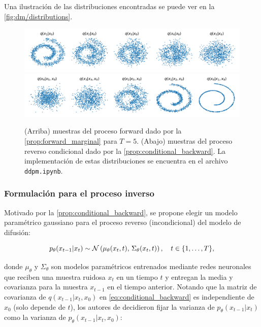 Una ilustración de las distribuciones encontradas se puede ver en la \autoref{fig:dm/distributions}.

\begin{figure}[!ht]
    \centering
    \includegraphics[width=\textwidth]{images/dm/ddpm_forward}
    \includegraphics[width=\textwidth]{images/dm/ddpm_conditional_backward}
    \caption{(Arriba) muestras del proceso forward dado por la \autoref{prop:forward_marginal} para $T=5$. (Abajo) muestras del proceso reverso condicional dado por la \autoref{prop:conditional_backward}. La implementación de estas distribuciones se encuentra en el archivo \texttt{ddpm.ipynb}.}
    \label{fig:dm/distributions}
\end{figure}

\subsubsection{Formulación para el proceso inverso}

Motivado por la \autoref{prop:conditional_backward}, se propone elegir un modelo paramétrico gaussiano para el proceso reverso (incondicional) del modelo de difusión:

\begin{equation}
    \label{eq:backward_transition}
    p_\theta(x_{t-1}|x_t)\sim\mathcal{N}\left(\mu_\theta(x_t,t),\,\Sigma_\theta(x_t,t)\right),
    \quad t\in\{1,\ldots,T\},
\end{equation}

donde $\mu_\theta$ y $\Sigma_\theta$ son modelos paramétricos entrenados mediante redes neuronales que reciben una muestra ruidosa $x_t$ en un tiempo $t$ y entregan la media y covarianza para la muestra $x_{t-1}$ en el tiempo anterior. Notando que la matriz de covarianza de $q(x_{t-1}|x_t,x_0)$ en \eqref{eq:conditional_backward} es independiente de $x_0$ (solo depende de $t$), los autores de \cite{ho2020denoising} decidieron fijar la varianza de $p_\theta(x_{t-1}|x_t)$ como la varianza de $p_\theta(x_{t-1}|x_t,x_0)$:

